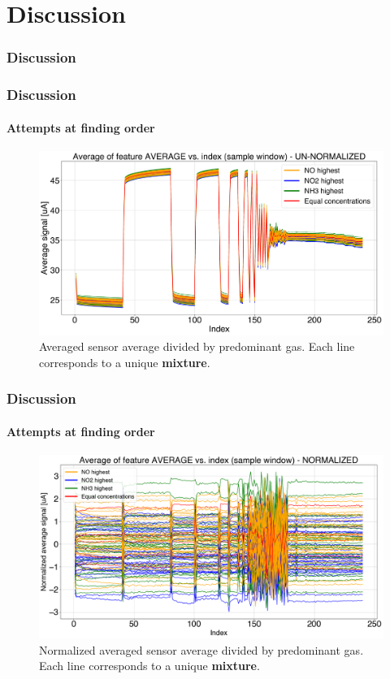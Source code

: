 \documentclass{beamer}
\begin{document}
\section{Discussion}
\begin{frame}
	\frametitle{Discussion}
	
\end{frame}


\begin{frame}
	\frametitle{Discussion}
	\framesubtitle{Attempts at finding order}
		\begin{figure}
			\includegraphics[width=1\linewidth]{../../figures/order1.png}
			\caption{Averaged sensor average divided by predominant gas. Each line corresponds to a unique \textbf{mixture}.}
		\end{figure}
\end{frame}

\begin{frame}
	\frametitle{Discussion}
	\framesubtitle{Attempts at finding order}
	
		\begin{figure}
		\includegraphics[width=1\linewidth]{../../figures/order1-norm.png}
		\caption{Normalized averaged sensor average divided by predominant gas. Each line corresponds to a unique \textbf{mixture}.}
	\end{figure}
\end{frame}
\end{document}

